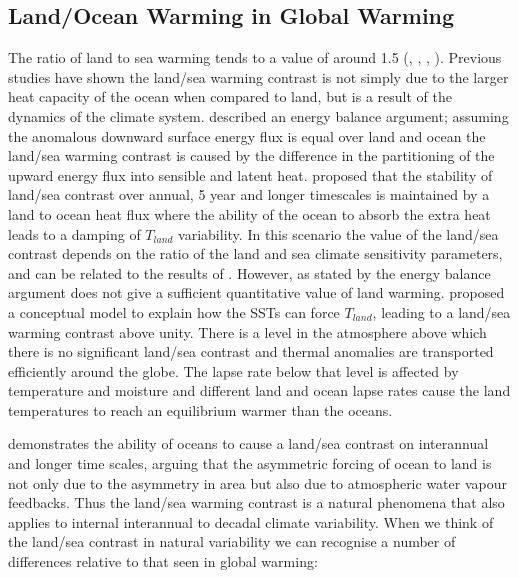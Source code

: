 \subsection{Land/Ocean Warming in Global Warming}
The ratio of land to sea warming tends to a value of around 1.5  
(\citealt{Sutton2007}, \citealt{Lambert2007}, \citealt{Compo2008},
\citealt{Dommenget2009}). Previous studies have shown the land/sea warming 
contrast is not simply due to the larger heat capacity of the ocean when 
compared to land, but is a result of the dynamics of the climate system.  
\citet{Sutton2007} described an energy balance argument; assuming the anomalous 
downward surface energy flux is equal over land and ocean the land/sea warming 
contrast is caused by the difference in the partitioning of the upward energy 
flux into sensible and latent heat.  \citet*{Lambert2007} proposed that the 
stability of land/sea contrast over annual, 5 year and longer timescales is 
maintained by a land to ocean heat flux where the ability of the ocean to absorb 
the extra heat leads to a damping of $T_{land}$ variability. In this scenario 
the value of the land/sea contrast depends on the ratio of the land and sea 
climate sensitivity parameters, and can be related to the results of 
\citet{Sutton2007}.  However, as stated by \citet{Byrne2013a} the energy balance 
argument does not give a sufficient quantitative value of land warming.  
\citet{Joshi2008} proposed a conceptual model to explain how the SSTs can force 
$T_{land}$, leading to a land/sea warming contrast above unity.  There is a 
level in the atmosphere above which there is no significant land/sea contrast 
and thermal anomalies are transported efficiently around the globe. The lapse 
rate below that level is affected by temperature and moisture and different land 
and ocean lapse rates cause the land temperatures to reach an equilibrium warmer 
than the oceans.  

\citet{Dommenget2009} demonstrates the ability of oceans to cause a land/sea 
contrast on interannual and longer time scales, arguing that the asymmetric 
forcing of ocean to land is not only due to the asymmetry in area but also due 
to atmospheric water vapour feedbacks. Thus the land/sea warming contrast is a 
natural phenomena that also applies to internal interannual to decadal climate 
variability. When we think of the land/sea contrast in natural variability we 
can recognise a number of differences relative to that seen in global warming: 


